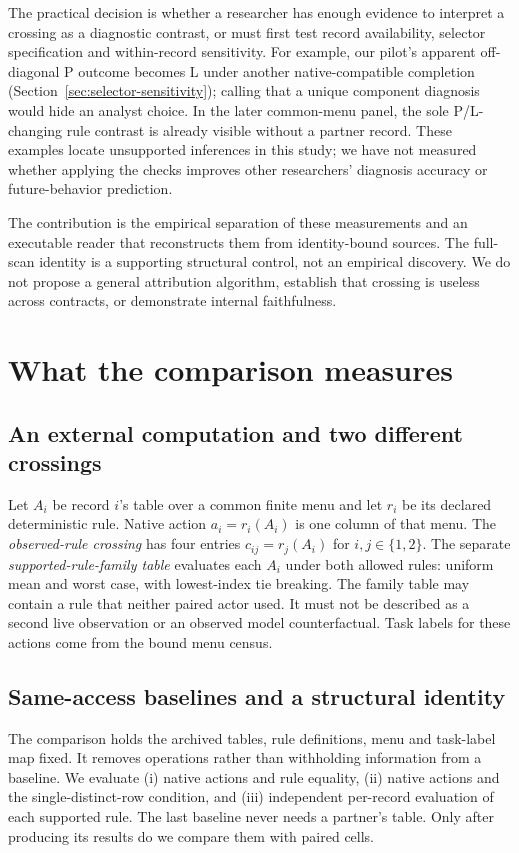 The practical decision is whether a researcher has enough evidence to
interpret a crossing as a diagnostic contrast, or must first test record
availability, selector specification and within-record sensitivity. For
example, our pilot's apparent off-diagonal P outcome becomes L under another
native-compatible completion (Section~\ref{sec:selector-sensitivity}); calling
that a unique component diagnosis would hide an analyst choice. In the later
common-menu panel, the sole P/L-changing rule contrast is already visible
without a partner record. These examples locate unsupported inferences in
this study; we have not measured whether applying the checks improves other
researchers' diagnosis accuracy or future-behavior prediction.

The contribution is the empirical separation of these measurements and an
executable reader that reconstructs them from identity-bound sources. The
full-scan identity is a supporting structural control, not an empirical
discovery. We do not propose a general attribution algorithm, establish that
crossing is useless across contracts, or demonstrate internal faithfulness.

\section{What the comparison measures}
\subsection{An external computation and two different crossings}
Let $A_i$ be record $i$'s table over a common finite menu and let $r_i$
be its declared deterministic rule. Native action $a_i=r_i(A_i)$ is one
column of that menu. The \emph{observed-rule crossing} has four entries
$c_{ij}=r_j(A_i)$ for $i,j\in\{1,2\}$. The separate
\emph{supported-rule-family table} evaluates each $A_i$ under both allowed
rules: uniform mean and worst case, with lowest-index tie breaking.
The family table may contain a rule that neither paired actor used.
It must not be described as a second live observation or an observed model
counterfactual. Task labels for these actions come from the bound menu census.

\subsection{Same-access baselines and a structural identity}
The comparison holds the archived tables, rule definitions, menu and task-label
map fixed. It removes operations rather than withholding information from a
baseline. We evaluate (i) native actions and rule equality, (ii) native actions
and the single-distinct-row condition, and (iii) independent per-record
evaluation of each supported rule. The last baseline never needs a partner's
table. Only after producing its results do we compare them with paired cells.

